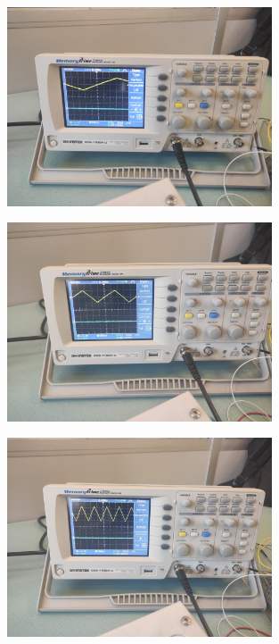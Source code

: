 \documentclass[pdftex,12pt,a4paper]{article}
\begin{document}
\begin{figure}[H]
	\centering
	\includegraphics[width=0.7\textwidth]{ex6-4.png}
	\caption{}
	\label{fig11}
\end{figure}

\begin{figure}[H]
	\centering
	\includegraphics[width=0.7\textwidth]{ex6-5.png}
	\caption{}
	\label{fig12}
\end{figure}

\begin{figure}[H]
	\centering
	\includegraphics[width=0.7\textwidth]{ex6-6.png}
	\caption{}
	\label{fig13}
\end{figure}
\end{document}
